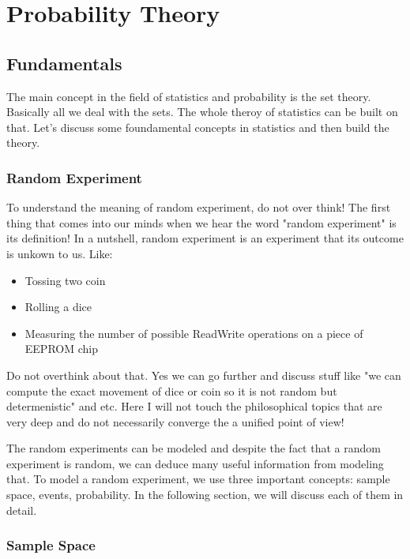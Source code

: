 \chapter{Probability Theory}

\section{Fundamentals}

The main concept in the field of statistics and probability is the set theory. Basically all we deal with the sets. The whole theroy of statistics can be built on that. Let's discuss some foundamental concepts in statistics and then build the theory.

\subsection{Random Experiment}
To understand the meaning of random experiment, do not over think! The first thing that comes into our minds when we hear the word "random experiment" is its definition! In a nutshell, random experiment is an experiment that its outcome is unkown to us. Like:

\begin{itemize}
	\item Tossing two coin
	\item Rolling a dice
	\item Measuring the number of possible ReadWrite operations on a piece of EEPROM chip
\end{itemize}

Do not overthink about that. Yes we can go further and discuss stuff like "we can compute the exact movement of dice or coin so it is not random but determenistic" and etc. Here I will not touch the philosophical topics that are very deep and do not necessarily converge the a unified point of view!

The random experiments can be modeled and despite the fact that a random experiment is random, we can deduce many useful information from modeling that. To model a random experiment, we use three important concepts: sample space, events, probability. In the following section, we will discuss each of them in detail.


\subsection{Sample Space}

